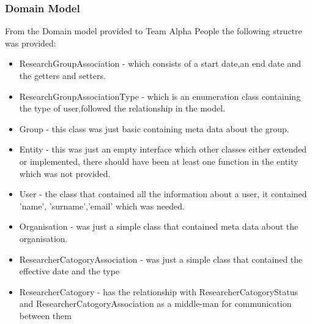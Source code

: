 \documentclass{article}
\begin{document}
	\subsubsection{Domain Model}
	From the Domain model provided to Team Alpha People the following structre was provided:
	\begin{itemize}
	 \item ResearchGroupAssociation - which consists of a start date,an end date and the getters and setters.
	 \item ResearchGroupAssociationType - which is an enumeration class containing the type of user,followed the relationship in the model.
	 \item Group - this class was just basic containing meta data about the group.
	 \item Entity - this was just an empty interface which other classes either extended or implemented, there should have been at least one function in the entity which was not provided.
	 \item User - the class that contained all the information about a user, it contained 'name', 'surname','email' which was needed.
	 \item Organisation - was just a simple class that contained meta data about the organisation.
	 \item ResearcherCatogoryAssociation - was just a simple class that contained the effective date and the type
	 \item ResearcherCatogory - has the relationship with ResearcherCatogoryStatus and ResearcherCatogoryAssociation as a middle-man for communication between them
	 
	 
	 

	\end{itemize}

	
\end{document}
